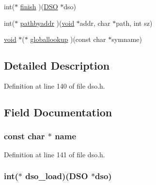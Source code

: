 \begin{DoxyCompactItemize}
\item 
int($\ast$ \hyperlink{structdso__meth__st_a2b439f5784dbc30da93d2b34c6dfe9bf}{finish} )(\hyperlink{crypto_2dso_2dso_8h_a4ef2aefd03a4e43c3dd81a159fd27bca}{D\+SO} $\ast$dso)
\item 
int($\ast$ \hyperlink{structdso__meth__st_a5fd57212f9b2d00350a73c945c57f132}{pathbyaddr} )(\hyperlink{hw__4758__cca_8h_afad4d591c7931ff6dc5bf69c76c96aa0}{void} $\ast$addr, char $\ast$path, int sz)
\item 
\hyperlink{hw__4758__cca_8h_afad4d591c7931ff6dc5bf69c76c96aa0}{void} $\ast$($\ast$ \hyperlink{structdso__meth__st_ad68d27a8fce53b86d9f6161e47b7370c}{globallookup} )(const char $\ast$symname)
\end{DoxyCompactItemize}


\subsection{Detailed Description}


Definition at line 140 of file dso.\+h.



\subsection{Field Documentation}
\subsubsection[{\texorpdfstring{name}{name}}]{\setlength{\rightskip}{0pt plus 5cm}const char $\ast$ name}\hypertarget{structdso__meth__st_afcd1706c9144e6d6eee6127661ae3be2}{}\label{structdso__meth__st_afcd1706c9144e6d6eee6127661ae3be2}


Definition at line 141 of file dso.\+h.

\subsubsection[{\texorpdfstring{dso\+\_\+load}{dso_load}}]{\setlength{\rightskip}{0pt plus 5cm}int($\ast$ dso\+\_\+load)({\bf D\+SO} $\ast$dso)}\hypertarget{structdso__meth__st_aa2924ebbd5eb5db60aa9a0bb113a7ae0}{}\label{structdso__meth__st_aa2924ebbd5eb5db60aa9a0bb113a7ae0}


